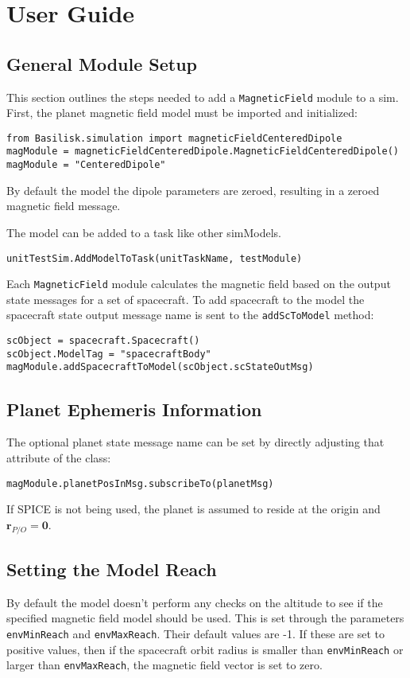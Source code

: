 
\section{User Guide}

\subsection{General Module Setup}
This section outlines the steps needed to add a {\tt MagneticField} module to a sim.
First, the planet magnetic field model must be imported and initialized:
\begin{verbatim}
from Basilisk.simulation import magneticFieldCenteredDipole
magModule = magneticFieldCenteredDipole.MagneticFieldCenteredDipole()
magModule = "CenteredDipole"
\end{verbatim}
By default the model the dipole parameters are zeroed, resulting in a zeroed magnetic field message. 

The model can  be added to a task like other simModels. 
\begin{verbatim}
unitTestSim.AddModelToTask(unitTaskName, testModule)
\end{verbatim}

Each {\tt MagneticField} module calculates the magnetic field based on the output state messages for a set of spacecraft.
To add spacecraft to the model the spacecraft state output message name is sent to the \verb|addScToModel| method:
\begin{verbatim}
scObject = spacecraft.Spacecraft()
scObject.ModelTag = "spacecraftBody"
magModule.addSpacecraftToModel(scObject.scStateOutMsg)
\end{verbatim}

\subsection{Planet Ephemeris Information}
The optional planet state message name can be set by directly adjusting that attribute of the class:
\begin{verbatim}
magModule.planetPosInMsg.subscribeTo(planetMsg)
\end{verbatim}
If SPICE is not being used, the planet is assumed to reside at the origin and $\bm r_{P/O} = \bm 0$.

\subsection{Setting the Model Reach}
By default the model doesn't perform any checks on the altitude to see if the specified magnetic field model should be used.  This is set through the parameters {\tt envMinReach} and {\tt envMaxReach}.  Their default values are -1.  If these are set to positive values, then if the spacecraft orbit radius is smaller than {\tt envMinReach} or larger than {\tt envMaxReach}, the magnetic field vector is set to zero.


